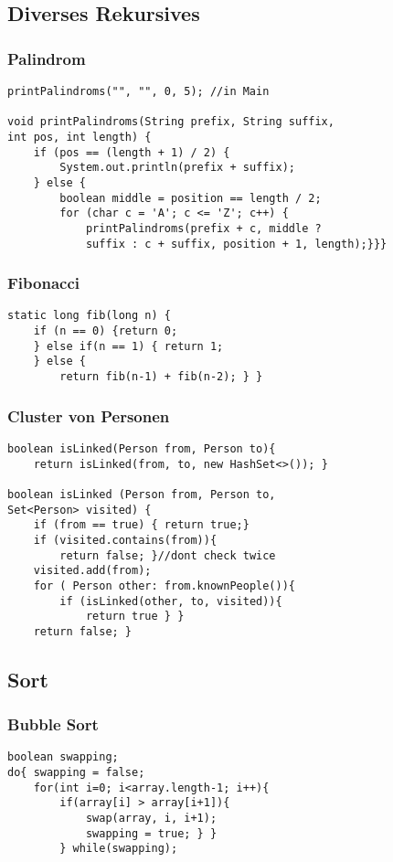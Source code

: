 \begin{multicols*}{5}
	\subsection{Diverses Rekursives}
	\subsubsection{Palindrom}
	\begin{lstlisting}
printPalindroms("", "", 0, 5); //in Main

void printPalindroms(String prefix, String suffix, 
int pos, int length) {
	if (pos == (length + 1) / 2) {
		System.out.println(prefix + suffix);
	} else {
		boolean middle = position == length / 2;
		for (char c = 'A'; c <= 'Z'; c++) {
			printPalindroms(prefix + c, middle ? 
			suffix : c + suffix, position + 1, length);}}}
	\end{lstlisting}
	\subsubsection{Fibonacci}
		\begin{lstlisting}
static long fib(long n) {
	if (n == 0) {return 0;
	} else if(n == 1) { return 1;
	} else { 
		return fib(n-1) + fib(n-2);	} }
		\end{lstlisting}
	\subsubsection{Cluster von Personen}
		\begin{lstlisting}
boolean isLinked(Person from, Person to){
	return isLinked(from, to, new HashSet<>()); }

boolean isLinked (Person from, Person to, 
Set<Person> visited) {
	if (from == true) { return true;}
	if (visited.contains(from)){
		return false; }//dont check twice
	visited.add(from);
	for ( Person other: from.knownPeople()){
		if (isLinked(other, to, visited)){
			return true	} }
	return false; }
		\end{lstlisting}

	\subsection{Sort}
	\subsubsection{Bubble Sort}
	\begin{lstlisting}
boolean swapping;
do{	swapping = false;
	for(int i=0; i<array.length-1; i++){
		if(array[i] > array[i+1]){
			swap(array, i, i+1);
			swapping = true; } }
		} while(swapping);
	\end{lstlisting}


\end{multicols*}
